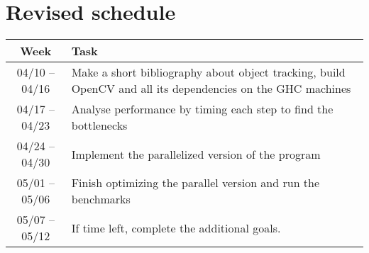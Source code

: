 \documentclass[11pt,english,letter]{article}
\begin{document}
\section{Revised schedule}

\begin{center}
\begin{tabular}{cp{12cm}}\hline
    Week&Task\\\hline
    04/10 -- 04/16&Make a short bibliography about object tracking, build OpenCV and all its dependencies on the GHC machines\\
    04/17 -- 04/23&Analyse performance by timing each step to find the bottlenecks\\
    04/24 -- 04/30&Implement the parallelized version of the program\\
    05/01 -- 05/06&Finish optimizing the parallel version and run the benchmarks\\
    05/07 -- 05/12&If time left, complete the additional goals.\\\hline
\end{tabular}
\end{center}



\end{document}
